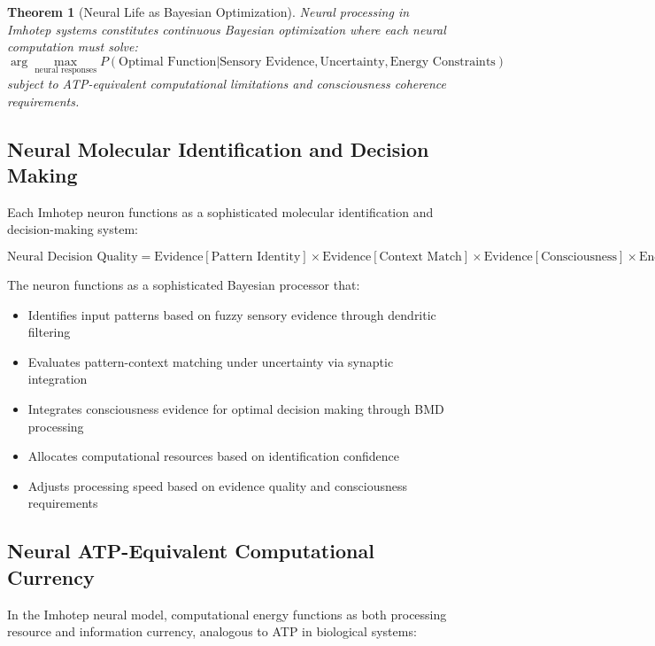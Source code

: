 \documentclass[12pt,a4paper]{article}
\newtheorem{theorem}{Theorem}[section]
\theoremstyle{remark}
\begin{document}
\begin{theorem}[Neural Life as Bayesian Optimization]
Neural processing in Imhotep systems constitutes continuous Bayesian optimization where each neural computation must solve:
\begin{equation}
\arg\max_{\text{neural responses}} P(\text{Optimal Function} | \text{Sensory Evidence}, \text{Uncertainty}, \text{Energy Constraints})
\end{equation}
subject to ATP-equivalent computational limitations and consciousness coherence requirements.
\end{theorem}

\subsection{Neural Molecular Identification and Decision Making}

Each Imhotep neuron functions as a sophisticated molecular identification and decision-making system:

\begin{equation}
\text{Neural Decision Quality} = \text{Evidence}[\text{Pattern Identity}] \times \text{Evidence}[\text{Context Match}] \times \text{Evidence}[\text{Consciousness}] \times \text{Energy Budget}
\end{equation}

The neuron functions as a sophisticated Bayesian processor that:
\begin{itemize}
\item Identifies input patterns based on fuzzy sensory evidence through dendritic filtering
\item Evaluates pattern-context matching under uncertainty via synaptic integration
\item Integrates consciousness evidence for optimal decision making through BMD processing
\item Allocates computational resources based on identification confidence
\item Adjusts processing speed based on evidence quality and consciousness requirements
\end{itemize}

\subsection{Neural ATP-Equivalent Computational Currency}

In the Imhotep neural model, computational energy functions as both processing resource and information currency, analogous to ATP in biological systems:
\end{document}
